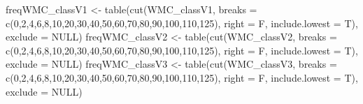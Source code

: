 \documentclass[
]{article}
\newenvironment{Shaded}{\begin{snugshade}}{\end{snugshade}}
\newcommand{\AttributeTok}[1]{\textcolor[rgb]{0.77,0.63,0.00}{#1}}
\newcommand{\ConstantTok}[1]{\textcolor[rgb]{0.00,0.00,0.00}{#1}}
\newcommand{\DecValTok}[1]{\textcolor[rgb]{0.00,0.00,0.81}{#1}}
\newcommand{\FunctionTok}[1]{\textcolor[rgb]{0.00,0.00,0.00}{#1}}
\newcommand{\NormalTok}[1]{#1}
\newcommand{\OtherTok}[1]{\textcolor[rgb]{0.56,0.35,0.01}{#1}}
\begin{document}
\begin{Shaded}
\begin{Highlighting}[]
\NormalTok{freqWMC\_classV1 }\OtherTok{\textless{}{-}} \FunctionTok{table}\NormalTok{(}\FunctionTok{cut}\NormalTok{(WMC\_classV1, }\AttributeTok{breaks =} \FunctionTok{c}\NormalTok{(}\DecValTok{0}\NormalTok{,}\DecValTok{2}\NormalTok{,}\DecValTok{4}\NormalTok{,}\DecValTok{6}\NormalTok{,}\DecValTok{8}\NormalTok{,}\DecValTok{10}\NormalTok{,}\DecValTok{20}\NormalTok{,}\DecValTok{30}\NormalTok{,}\DecValTok{40}\NormalTok{,}\DecValTok{50}\NormalTok{,}\DecValTok{60}\NormalTok{,}\DecValTok{70}\NormalTok{,}\DecValTok{80}\NormalTok{,}\DecValTok{90}\NormalTok{,}\DecValTok{100}\NormalTok{,}\DecValTok{110}\NormalTok{,}\DecValTok{125}\NormalTok{), }\AttributeTok{right =}\NormalTok{ F, }\AttributeTok{include.lowest =}\NormalTok{ T), }\AttributeTok{exclude =} \ConstantTok{NULL}\NormalTok{)}
\NormalTok{freqWMC\_classV2 }\OtherTok{\textless{}{-}} \FunctionTok{table}\NormalTok{(}\FunctionTok{cut}\NormalTok{(WMC\_classV2, }\AttributeTok{breaks =} \FunctionTok{c}\NormalTok{(}\DecValTok{0}\NormalTok{,}\DecValTok{2}\NormalTok{,}\DecValTok{4}\NormalTok{,}\DecValTok{6}\NormalTok{,}\DecValTok{8}\NormalTok{,}\DecValTok{10}\NormalTok{,}\DecValTok{20}\NormalTok{,}\DecValTok{30}\NormalTok{,}\DecValTok{40}\NormalTok{,}\DecValTok{50}\NormalTok{,}\DecValTok{60}\NormalTok{,}\DecValTok{70}\NormalTok{,}\DecValTok{80}\NormalTok{,}\DecValTok{90}\NormalTok{,}\DecValTok{100}\NormalTok{,}\DecValTok{110}\NormalTok{,}\DecValTok{125}\NormalTok{), }\AttributeTok{right =}\NormalTok{ F, }\AttributeTok{include.lowest =}\NormalTok{ T), }\AttributeTok{exclude =} \ConstantTok{NULL}\NormalTok{)}
\NormalTok{freqWMC\_classV3 }\OtherTok{\textless{}{-}} \FunctionTok{table}\NormalTok{(}\FunctionTok{cut}\NormalTok{(WMC\_classV3, }\AttributeTok{breaks =} \FunctionTok{c}\NormalTok{(}\DecValTok{0}\NormalTok{,}\DecValTok{2}\NormalTok{,}\DecValTok{4}\NormalTok{,}\DecValTok{6}\NormalTok{,}\DecValTok{8}\NormalTok{,}\DecValTok{10}\NormalTok{,}\DecValTok{20}\NormalTok{,}\DecValTok{30}\NormalTok{,}\DecValTok{40}\NormalTok{,}\DecValTok{50}\NormalTok{,}\DecValTok{60}\NormalTok{,}\DecValTok{70}\NormalTok{,}\DecValTok{80}\NormalTok{,}\DecValTok{90}\NormalTok{,}\DecValTok{100}\NormalTok{,}\DecValTok{110}\NormalTok{,}\DecValTok{125}\NormalTok{), }\AttributeTok{right =}\NormalTok{ F, }\AttributeTok{include.lowest =}\NormalTok{ T), }\AttributeTok{exclude =} \ConstantTok{NULL}\NormalTok{)}


\end{Highlighting}
\end{Shaded}
\end{document}

